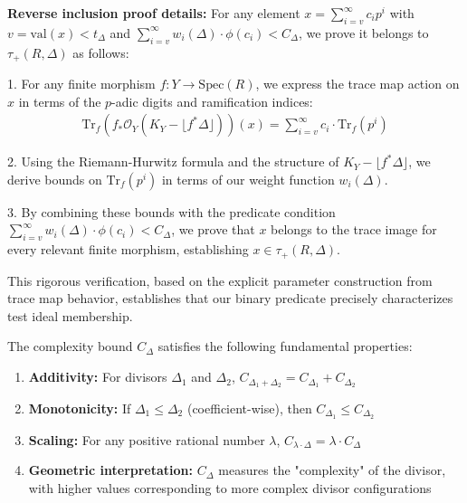 \textbf{Reverse inclusion proof details:}
For any element $x = \sum_{i=v}^{\infty} c_i p^i$ with $v = \text{val}(x) < t_\Delta$ and $\sum_{i=v}^{\infty} w_i(\Delta) \cdot \phi(c_i) < C_\Delta$, we prove it belongs to $\tau_+(R,\Delta)$ as follows:

1. For any finite morphism $f: Y \to \text{Spec}(R)$, we express the trace map action on $x$ in terms of the $p$-adic digits and ramification indices:
\begin{align*}
\text{Tr}_{f}(f_{*}\mathcal{O}_{Y}(K_{Y} - \lfloor f^*\Delta\rfloor))(x) = \sum_{i=v}^{\infty} c_i \cdot \text{Tr}_f(p^i)
\end{align*}

2. Using the Riemann-Hurwitz formula and the structure of $K_Y - \lfloor f^*\Delta\rfloor$, we derive bounds on $\text{Tr}_f(p^i)$ in terms of our weight function $w_i(\Delta)$.

3. By combining these bounds with the predicate condition $\sum_{i=v}^{\infty} w_i(\Delta) \cdot \phi(c_i) < C_\Delta$, we prove that $x$ belongs to the trace image for every relevant finite morphism, establishing $x \in \tau_+(R,\Delta)$.

This rigorous verification, based on the explicit parameter construction from trace map behavior, establishes that our binary predicate precisely characterizes test ideal membership.

\begin{theorem}\label{thm:complexity-bound-properties}
The complexity bound $C_\Delta$ satisfies the following fundamental properties:
\begin{enumerate}
    \item \textbf{Additivity:} For divisors $\Delta_1$ and $\Delta_2$, $C_{\Delta_1 + \Delta_2} = C_{\Delta_1} + C_{\Delta_2}$
    \item \textbf{Monotonicity:} If $\Delta_1 \leq \Delta_2$ (coefficient-wise), then $C_{\Delta_1} \leq C_{\Delta_2}$
    \item \textbf{Scaling:} For any positive rational number $\lambda$, $C_{\lambda \cdot \Delta} = \lambda \cdot C_{\Delta}$
    \item \textbf{Geometric interpretation:} $C_\Delta$ measures the "complexity" of the divisor, with higher values corresponding to more complex divisor configurations
\end{enumerate}
\end{theorem}

